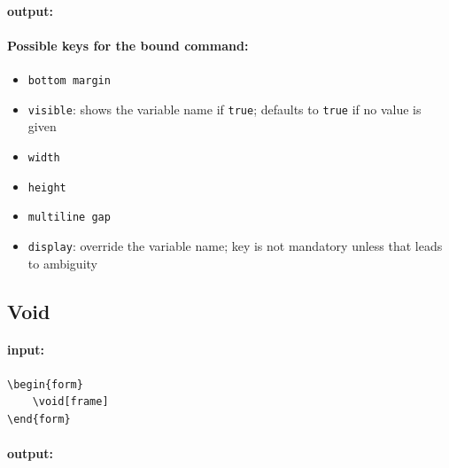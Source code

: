 \documentclass[parskip=half-]{scrartcl}
\begin{document}
\paragraph{output:}
\begin{center}
\end{center}

\makeatletter
\def\form@print@inject{}
\makeatother

\paragraph{Possible keys for the bound command:}
\begin{itemize}
    \item \verb|bottom margin|
    \item \verb|visible|: shows the variable name if \verb|true|; defaults to \verb|true| if no value is given
    \item \verb|width|
    \item \verb|height|
    \item \verb|multiline gap|
    \item \verb|display|: override the variable name; key is not mandatory unless that leads to ambiguity
\end{itemize}

\subsection{Void}
\label{com:void}

\paragraph{input:}
\begin{verbatim}
\begin{form}
    \void[frame]
\end{form}
\end{verbatim}

\makeatletter
\def\form@print@inject{
    \put(4,-1){\scalebox{0.1}{\color{red}width}}
    \put(-3,2.3){\scalebox{0.1}{\color{red}height}}
}
\makeatother

\paragraph{output:}
\begin{center}
    \scalebox{5}{
        \begin{form}
            \void[frame]
        \end{form}
    }
\end{center}
\end{document}
